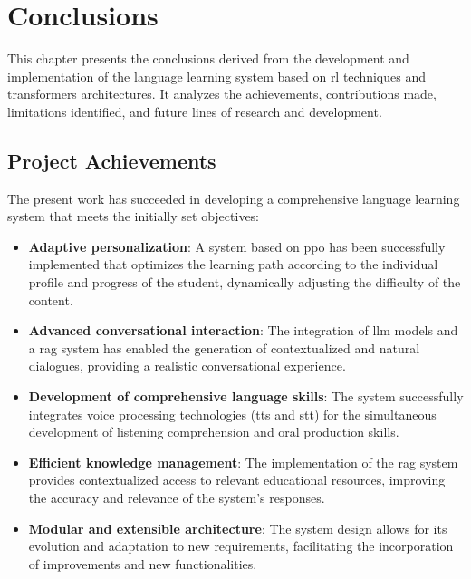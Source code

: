 \chapter{Conclusions}
\label{conclusions}

This chapter presents the conclusions derived from the development and implementation of the language learning system based on \gls{rl} techniques and \gls{transformers} architectures. It analyzes the achievements, contributions made, limitations identified, and future lines of research and development.

\section{Project Achievements}
\label{sec:project-achievements}

The present work has succeeded in developing a comprehensive language learning system that meets the initially set objectives:

\begin{itemize}
    \item \textbf{Adaptive personalization}: A system based on \gls{ppo} has been successfully implemented that optimizes the learning path according to the individual profile and progress of the student, dynamically adjusting the difficulty of the content.
    
    \item \textbf{Advanced conversational interaction}: The integration of \gls{llm} models and a \gls{rag} system has enabled the generation of contextualized and natural dialogues, providing a realistic conversational experience.
    
    \item \textbf{Development of comprehensive language skills}: The system successfully integrates voice processing technologies (\gls{tts} and \gls{stt}) for the simultaneous development of listening comprehension and oral production skills.
    
    \item \textbf{Efficient knowledge management}: The implementation of the \gls{rag} system provides contextualized access to relevant educational resources, improving the accuracy and relevance of the system's responses.
    
    \item \textbf{Modular and extensible architecture}: The system design allows for its evolution and adaptation to new requirements, facilitating the incorporation of improvements and new functionalities.
\end{itemize}

